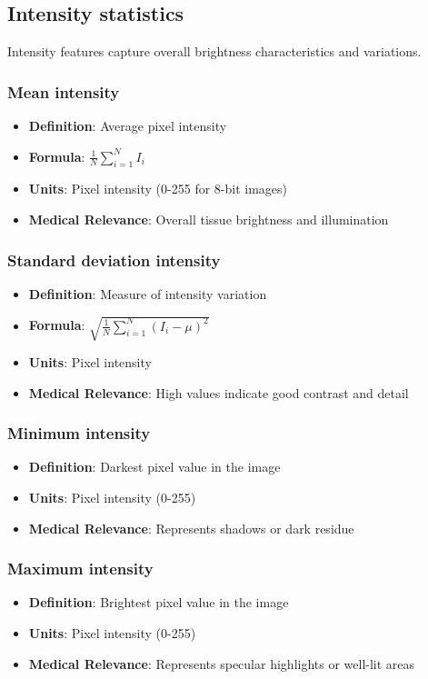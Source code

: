 \documentclass[11pt]{article}
\begin{document}
\subsection{Intensity statistics}

Intensity features capture overall brightness characteristics and variations.

\subsubsection{Mean intensity}
\begin{itemize}
    \item \textbf{Definition}: Average pixel intensity
    \item \textbf{Formula}: $\displaystyle \frac{1}{N}\sum_{i=1}^N I_i$
    \item \textbf{Units}: Pixel intensity (0-255 for 8-bit images)
    \item \textbf{Medical Relevance}: Overall tissue brightness and illumination
\end{itemize}

\subsubsection{Standard deviation intensity}
\begin{itemize}
    \item \textbf{Definition}: Measure of intensity variation
    \item \textbf{Formula}: $\displaystyle \sqrt{\frac{1}{N}\sum_{i=1}^N (I_i - \mu)^2}$
    \item \textbf{Units}: Pixel intensity
    \item \textbf{Medical Relevance}: High values indicate good contrast and detail
\end{itemize}

\subsubsection{Minimum intensity}
\begin{itemize}
    \item \textbf{Definition}: Darkest pixel value in the image
    \item \textbf{Units}: Pixel intensity (0-255)
    \item \textbf{Medical Relevance}: Represents shadows or dark residue
\end{itemize}

\subsubsection{Maximum intensity}
\begin{itemize}
    \item \textbf{Definition}: Brightest pixel value in the image
    \item \textbf{Units}: Pixel intensity (0-255)
    \item \textbf{Medical Relevance}: Represents specular highlights or well-lit areas
\end{itemize}
\end{document}
